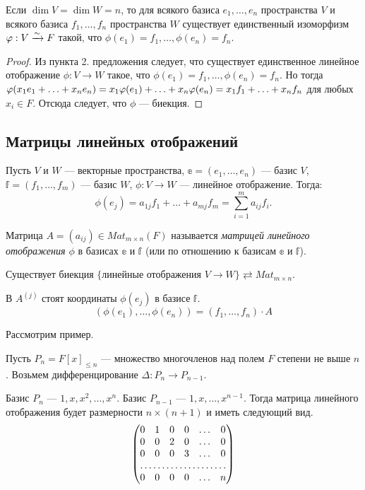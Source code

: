 \begin{Consequence}
Если $\dim V = \dim W = n$, то для всякого базиса $e_1, \ldots, e_n$ пространства $V$ и всякого базиса $f_1, \ldots , f_n$ пространства $W$ существует единственный изоморфизм $\varphi: V \xrightarrow{\sim} F$ такой, что $\phi(e_1) = f_1, \ldots, \phi(e_n) = f_n$.
\end{Consequence}
\begin{proof}
Из пункта 2. предложения следует, что существует единственное линейное отображение $\phi: V \rightarrow W$ такое, что $\phi(e_1) = f_1, \ldots, \phi(e_n) = f_n$. Но тогда $\phi(x_1e_1 + \ldots + x_ne_n) \hm= x_1\phi(e_1) + \ldots + x_n\phi(e_n) = x_1f_1 + \ldots + x_nf_n$ для любых $x_i \in F$. Отсюда следует, что $\phi$ --- биекция. 
\end{proof}

\subsection{Матрицы линейных отображений}

Пусть $V$ и $W$ --- векторные пространства, $\mathbb{e} = (e_1, \ldots, e_n)$ --- базис $V$, $\mathbb{f} = (f_1, \ldots, f_m)$ --- базис $W$, $\phi: V \rightarrow W$ --- линейное отображение. Тогда:
\[
\phi(e_j) = a_{1j}f_1 + \ldots + a_{mj}f_m = \sum_{i = 1}^{m}a_{ij}f_i.
\]

\begin{Def}
Матрица $A = (a_{ij}) \in Mat_{m \times n}(F)$ называется \textit{матрицей линейного отображения $\phi$} в базисах $\mathbb{e}$ и $\mathbb{f}$ (или по отношению к базисам $\mathbb{e}$ и $\mathbb{f}$).
\end{Def}

\begin{Comment}
Существует биекция $\{\text{линейные отображения } V \rightarrow W \} \rightleftarrows Mat_{m\times n}$.
\end{Comment}

\begin{Comment}
В $A^{(j)}$ стоят координаты $\phi(e_j)$ в базисе $\mathbb{f}$.
\[
(\phi(e_1), \ldots, \phi(e_n)) = (f_1, \ldots, f_n)\cdot A
\]
\end{Comment}

Рассмотрим пример.

Пусть $P_n = F[x]_{\leqslant n}$ --- множество многочленов над полем $F$ степени не выше $n$. Возьмем дифференцирование $\Delta: P_n \rightarrow P_{n-1}$.

Базис $P_n$ --- $1, x, x^2, \ldots, x^n$. Базис $P_{n-1}$ --- $1, x, \ldots, x^{n-1}$. Тогда матрица линейного отображения будет размерности $n \times (n+1)$ и иметь следующий вид.
\[
\begin{pmatrix*}
0 & 1 & 0 & 0 & \dots & 0 \\
0 & 0 & 2 & 0 & \dots & 0 \\
0 & 0 & 0 & 3 & \dots & 0 \\
\hdotsfor{6} \\
0 & 0 & 0 & 0 & \dots & n
\end{pmatrix*}
\] 

